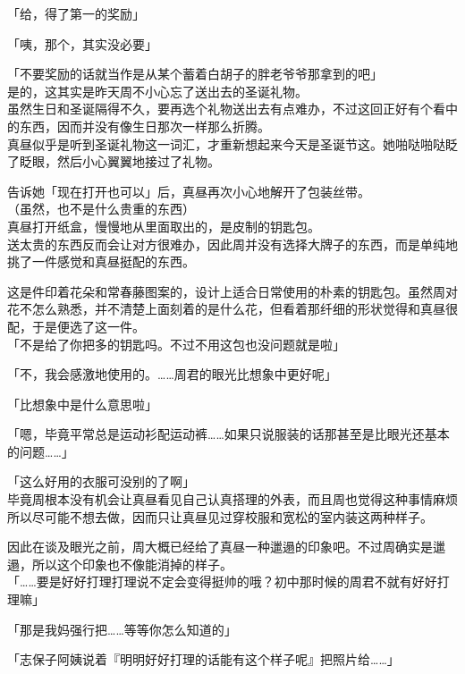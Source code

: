 「给，得了第一的奖励」

「咦，那个，其实没必要」

「不要奖励的话就当作是从某个蓄着白胡子的胖老爷爷那拿到的吧」\\

是的，这其实是昨天周不小心忘了送出去的圣诞礼物。\\

虽然生日和圣诞隔得不久，要再选个礼物送出去有点难办，不过这回正好有个看中的东西，因而并没有像生日那次一样那么折腾。\\

真昼似乎是听到圣诞礼物这一词汇，才重新想起来今天是圣诞节这。她啪哒啪哒眨了眨眼，然后小心翼翼地接过了礼物。

告诉她「现在打开也可以」后，真昼再次小心地解开了包装丝带。\\

（虽然，也不是什么贵重的东西）\\

真昼打开纸盒，慢慢地从里面取出的，是皮制的钥匙包。\\

送太贵的东西反而会让对方很难办，因此周并没有选择大牌子的东西，而是单纯地挑了一件感觉和真昼挺配的东西。

这是件印着花朵和常春藤图案的，设计上适合日常使用的朴素的钥匙包。虽然周对花不怎么熟悉，并不清楚上面刻着的是什么花，但看着那纤细的形状觉得和真昼很配，于是便选了这一件。\\

「不是给了你把多的钥匙吗。不过不用这包也没问题就是啦」

「不，我会感激地使用的。……周君的眼光比想象中更好呢」

「比想象中是什么意思啦」

「嗯，毕竟平常总是运动衫配运动裤……如果只说服装的话那甚至是比眼光还基本的问题……」

「这么好用的衣服可没别的了啊」\\

毕竟周根本没有机会让真昼看见自己认真搭理的外表，而且周也觉得这种事情麻烦所以尽可能不想去做，因而只让真昼见过穿校服和宽松的室内装这两种样子。

因此在谈及眼光之前，周大概已经给了真昼一种邋遢的印象吧。不过周确实是邋遢，所以这个印象也不像能消掉的样子。\\

「……要是好好打理打理说不定会变得挺帅的哦？初中那时候的周君不就有好好打理嘛」

「那是我妈强行把……等等你怎么知道的」

「志保子阿姨说着『明明好好打理的话能有这个样子呢』把照片给……」

